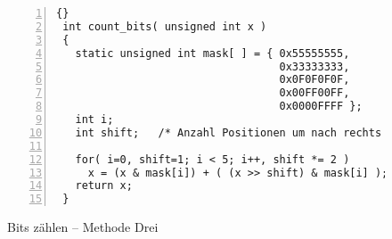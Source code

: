 \begin{figure}[ht]
\begin{lstlisting}[frame=tlrb, numbers=left]{}
 int count_bits( unsigned int x )
 {
   static unsigned int mask[ ] = { 0x55555555,
                                   0x33333333,
                                   0x0F0F0F0F,
                                   0x00FF00FF,
                                   0x0000FFFF };
   int i;
   int shift;   /* Anzahl Positionen um nach rechts zu schieben */

   for( i=0, shift=1; i < 5; i++, shift *= 2 )
     x = (x & mask[i]) + ( (x >> shift) & mask[i] );
   return x;
 }
\end{lstlisting}
\caption{Bits z\"{a}hlen -- Methode Drei \label{fig:method3}}
\end{figure}
